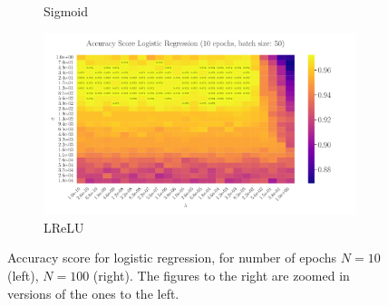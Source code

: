 \documentclass[%
reprint,
amsmath,amssymb,
aps,
]{revtex4-2}
\begin{document}
\begin{figure}
\begin{subfigure}{0.4353\textwidth}
	\caption{Sigmoid}
	\label{fig:LogReg25x25_epoch100_bacthS50}
\end{subfigure}
\hfill
\begin{subfigure}{0.4353\textwidth}
	\includegraphics[width=\textwidth]{Python/Figures/LogReg25x25_epoch10_batchS50_zoomed.pdf}
	\caption{LReLU}
	\label{fig:LogReg25x25_epoch100_bacthS50_zoomed}
\end{subfigure}
\caption{Accuracy score for logistic regression, for number of epochs \(N=10\) (left), \(N=100\) (right). The figures to the right are zoomed in versions of the ones to the left.}
\label{fig:LogReg}
\end{figure}
\end{document}

